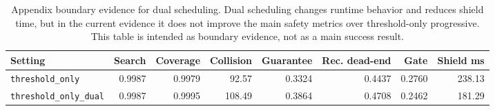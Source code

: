 \begin{table}[t]
\centering
\caption{Appendix boundary evidence for dual scheduling. Dual scheduling changes runtime behavior and reduces shield time, but in the current evidence it does not improve the main safety metrics over threshold-only progressive. This table is intended as boundary evidence, not as a main success result.}
\label{tab:appendix-dual-boundary}
\small
\begin{tabular}{lrrrrrrr}
\toprule
Setting & Search & Coverage & Collision & Guarantee & Rec. dead-end & Gate & Shield ms \\
\midrule
\texttt{threshold\_only} & 0.9987 & 0.9979 & 92.57 & 0.3324 & 0.4437 & 0.2760 & 238.13 \\
\texttt{threshold\_only\_dual} & 0.9987 & 0.9995 & 108.49 & 0.3864 & 0.4708 & 0.2462 & 181.29 \\
\bottomrule
\end{tabular}
\end{table}
